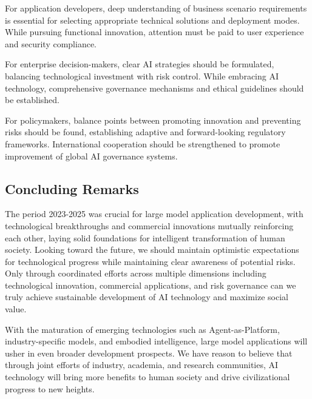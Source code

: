 \documentclass{article}
\begin{document}
For application developers, deep understanding of business scenario requirements is essential for selecting appropriate technical solutions and deployment modes. While pursuing functional innovation, attention must be paid to user experience and security compliance.

For enterprise decision-makers, clear AI strategies should be formulated, balancing technological investment with risk control. While embracing AI technology, comprehensive governance mechanisms and ethical guidelines should be established.

For policymakers, balance points between promoting innovation and preventing risks should be found, establishing adaptive and forward-looking regulatory frameworks. International cooperation should be strengthened to promote improvement of global AI governance systems.

\subsection{Concluding Remarks}
The period 2023-2025 was crucial for large model application development, with technological breakthroughs and commercial innovations mutually reinforcing each other, laying solid foundations for intelligent transformation of human society. Looking toward the future, we should maintain optimistic expectations for technological progress while maintaining clear awareness of potential risks. Only through coordinated efforts across multiple dimensions including technological innovation, commercial applications, and risk governance can we truly achieve sustainable development of AI technology and maximize social value.

With the maturation of emerging technologies such as Agent-as-Platform, industry-specific models, and embodied intelligence, large model applications will usher in even broader development prospects. We have reason to believe that through joint efforts of industry, academia, and research communities, AI technology will bring more benefits to human society and drive civilizational progress to new heights.
\end{document}
